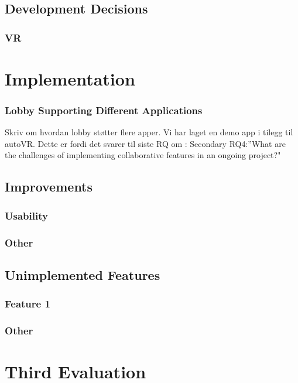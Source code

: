 \subsection{Development Decisions}
\subsubsection{VR}

\section{Implementation}

\subsubsection{Lobby Supporting Different Applications}
Skriv om hvordan lobby støtter flere apper. Vi har laget en demo app i tilegg til autoVR. Dette er fordi det svarer til siste RQ om : Secondary RQ4:”What  are  the  challenges  of  implementing  collaborative  features  in  an  ongoing project?"



\subsection{Improvements}
\subsubsection{Usability}
\subsubsection{Other}

\subsection{Unimplemented Features}
\subsubsection{Feature 1}
\subsubsection{Other}


\section{Third Evaluation}


